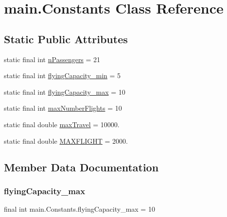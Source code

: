 \hypertarget{classmain_1_1_constants}{}\section{main.\+Constants Class Reference}
\label{classmain_1_1_constants}
\subsection*{Static Public Attributes}
\begin{DoxyCompactItemize}
\item 
static final int \hyperlink{classmain_1_1_constants_a4f0981009a65cde20f0cd7a0bd1f026c}{n\+Passengers} = 21
\item 
static final int \hyperlink{classmain_1_1_constants_ad3b337eb40c040b463574d1a0d57b81a}{flying\+Capacity\+\_\+min} = 5
\item 
static final int \hyperlink{classmain_1_1_constants_a4823c74e7121442db95a59a5cb57fc3e}{flying\+Capacity\+\_\+max} = 10
\item 
static final int \hyperlink{classmain_1_1_constants_aed2416272044cff49f016890c061e898}{max\+Number\+Flights} = 10
\item 
static final double \hyperlink{classmain_1_1_constants_af7e5c003644c6b5cd4bc9e8c70b0b466}{max\+Travel} = 10000.
\item 
static final double \hyperlink{classmain_1_1_constants_a0d47c64f10462610301889d8e526a3fc}{M\+A\+X\+F\+L\+I\+G\+HT} = 2000.
\end{DoxyCompactItemize}


\subsection{Member Data Documentation}
\mbox{\label{classmain_1_1_constants_a4823c74e7121442db95a59a5cb57fc3e}} 
\subsubsection{\texorpdfstring{flying\+Capacity\+\_\+max}{flyingCapacity\_max}}
{\footnotesize\ttfamily final int main.\+Constants.\+flying\+Capacity\+\_\+max = 10\hspace{0.3cm}{\ttfamily [static]}}


